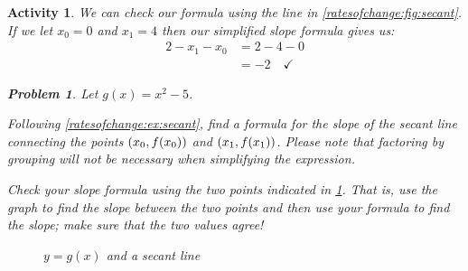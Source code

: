 \documentclass[12pt]{article}
\theoremstyle{activity}
\newtheorem{activity}{Activity}
\theoremstyle{problem}
\newtheorem{problem}{Problem}
\theoremstyle{example}
\theoremstyle{definition}
\theoremstyle{exercises}
\theoremstyle{exercise}
\begin{document}
\begin{activity}{}
We can check our formula using the line in \cref{ratesofchange:fig:secant}. If we let $x_0=0$ and $x_1=4$ then our simplified slope formula gives us: 
\begin{align*}
2-x_1-x_0
&= 2-4-0\\
&=-2\quad\checkmark
\end{align*}

\begin{problem}{}
Let $g(x)=x^2-5$.
\begin{parts}
\item  Following \cref{ratesofchange:ex:secant}, find a formula for the slope of the secant line connecting the points $\left(x_0,f\mleft(x_0\mright)\right)$ and $\left(x_1,f\mleft(x_1\mright)\right)$. Please note that factoring by grouping will not be necessary when simplifying the expression.
\item  Check your slope formula using the two points indicated in \cref{ratesofchange:fig:problem}. That is, use the graph to find the slope between the two points and then use your formula to find the slope; make sure that the two values agree!
\begin{figure}[!ht]
\centering
{}
\caption{$y=g(x)$ and a secant line}\label{ratesofchange:fig:problem}
\end{figure}

\end{parts}

\end{problem}
\end{activity}
\end{document}
